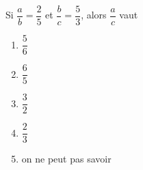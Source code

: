 Si $\dfrac ab=\dfrac25$ et $\dfrac bc=\dfrac53$, alors $\dfrac ac$ vaut
\begin{multicols}{3}
  \begin{enumerate}[A/]
  \item $\dfrac56$
  \item $\dfrac65$
  \item $\dfrac32$
  \item $\dfrac23$
  \item on ne peut pas savoir
  \end{enumerate}
\end{multicols}